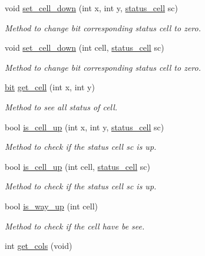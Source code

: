 \begin{DoxyCompactItemize}
void \hyperlink{classMaze_ab86292a84aa56a26c4c07f4aa684d9bb}{set\+\_\+cell\+\_\+down} (int x, int y, \hyperlink{classMaze_a07167e321eac2b67100fb82ecb98f1d1}{status\+\_\+cell} sc)
\begin{DoxyCompactList}\small\item\em Method to change bit corresponding status cell to zero. \end{DoxyCompactList}\item 
void \hyperlink{classMaze_a3635b71fab2c610376ae6613e7265fdf}{set\+\_\+cell\+\_\+down} (int cell, \hyperlink{classMaze_a07167e321eac2b67100fb82ecb98f1d1}{status\+\_\+cell} sc)
\begin{DoxyCompactList}\small\item\em Method to change bit corresponding status cell to zero. \end{DoxyCompactList}\item 
\hyperlink{maze_8h_a789d352559efaa396a258805d44f4289}{bit} \hyperlink{classMaze_ae07191c6ec3cc47fce1147bc3f03a8ad}{get\+\_\+cell} (int x, int y)
\begin{DoxyCompactList}\small\item\em Method to see all status of cell. \end{DoxyCompactList}\item 
bool \hyperlink{classMaze_a2b0e69e72d6c3e1037578f057946a21e}{is\+\_\+cell\+\_\+up} (int x, int y, \hyperlink{classMaze_a07167e321eac2b67100fb82ecb98f1d1}{status\+\_\+cell} sc)
\begin{DoxyCompactList}\small\item\em Method to check if the status cell sc is up. \end{DoxyCompactList}\item 
bool \hyperlink{classMaze_ad5dd6a918e4fd4bb6392e0a0bc08b81d}{is\+\_\+cell\+\_\+up} (int cell, \hyperlink{classMaze_a07167e321eac2b67100fb82ecb98f1d1}{status\+\_\+cell} sc)
\begin{DoxyCompactList}\small\item\em Method to check if the status cell sc is up. \end{DoxyCompactList}\item 
bool \hyperlink{classMaze_a308fa695665de6217c0e7f28aab5adda}{is\+\_\+way\+\_\+up} (int cell)
\begin{DoxyCompactList}\small\item\em Method to check if the cell have be see. \end{DoxyCompactList}\item 
int \hyperlink{classMaze_a8a04cd1335e96a80358181afa164d4c9}{get\+\_\+cols} (void)

\end{DoxyCompactItemize}
